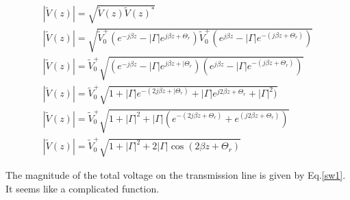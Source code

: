 \documentclass{ximera}
\begin{document}
\begin{eqnarray}
|\tilde{V}(z)|=\sqrt{\tilde{V}(z) \tilde{V}(z)^*} \nonumber  \\
|\tilde{V}(z)|=\sqrt{   \tilde{V}_0^+ (e^{-j \beta z} - |\Gamma|  e^{j \beta z +
 \Theta_r}  )  
   \tilde{V}_0^+ (e^{j \beta z} - |\Gamma|  e^{-(j \beta z + \Theta_r)}     )} \nonumber
\\
|\tilde{V}(z)|= \tilde{V}_0^+ \sqrt{(e^{-j \beta z} - |\Gamma|  e^{j \beta z +
|\Theta_r}  )  
  (e^{j \beta z} - |\Gamma|  e^{-(j \beta z + \Theta_r)}     )}
\nonumber \\
|\tilde{V}(z)|= \tilde{V}_0^+ \sqrt{1+  |\Gamma|  e^{-(2j \beta z +
|\Theta_r)}    + |\Gamma|  e^{j 2 \beta z + \Theta_r} +|\Gamma|^2     )}
\nonumber \\
|\tilde{V}(z)|= \tilde{V}_0^+ \sqrt{1+ |\Gamma|^2 + |\Gamma| ( e^{-(2j \beta z +
 \Theta_r)}   +  e^{(j 2 \beta z + \Theta_r)}     )}
 \nonumber \\
|\tilde{V}(z)|= \tilde{V}_0^+  \sqrt{1+ |\Gamma|^2 + 2 |\Gamma| \cos(2 \beta z +\Theta_r)} \label{sw1} 
\end{eqnarray}

The magnitude of the total voltage on the transmission line is given
by Eq.\ref{sw1}. It seems like a complicated function.
\end{document}
